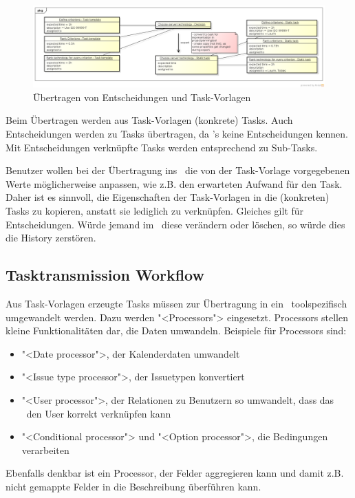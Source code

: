				\begin{figure}[H]
					\includegraphics[width=\textwidth]{architecture/media/img/decisionTaskRelation.png}
					\centering
					\caption{Übertragen von Entscheidungen und Task-Vorlagen}
					\label{fig:DecisionTaskRelation}
				\end{figure}
				
				Beim Übertragen werden aus Task-Vorlagen (konkrete) Tasks.
				Auch Entscheidungen werden zu Tasks übertragen, da \ppt's keine Entscheidungen kennen.
				Mit Entscheidungen verknüpfte Tasks werden entsprechend zu Sub-Tasks.
				
				Benutzer wollen bei der Übertragung ins \ppt\ die von der Task-Vorlage vorgegebenen Werte möglicherweise anpassen, wie z.B. den erwarteten Aufwand für den Task.
				Daher ist es sinnvoll, die Eigenschaften der Task-Vorlagen in die (konkreten) Tasks zu kopieren, anstatt sie lediglich zu verknüpfen.
				Gleiches gilt für Entscheidungen. Würde jemand im \dks\ diese verändern oder löschen,
				so würde dies die History zerstören.
			
		
		\subsection{Tasktransmission Workflow}
			Aus Task-Vorlagen erzeugte Tasks müssen zur Übertragung in ein \ppt\
			toolspezifisch umgewandelt werden. Dazu werden "<Processors"> eingesetzt.
			Processors stellen kleine Funktionalitäten dar, die Daten umwandeln.
			Beispiele für Processors sind:
			\begin{itemize}
				\item "<Date processor">, der Kalenderdaten umwandelt
				\item "<Issue type processor">, der Issuetypen konvertiert
				\item "<User processor">, der Relationen zu Benutzern so umwandelt, dass das \ppt\ den User korrekt verknüpfen kann
				\item "<Conditional processor"> und "<Option processor">, die Bedingungen verarbeiten
			\end{itemize}
			Ebenfalls denkbar ist ein Processor, der Felder aggregieren kann und damit z.B. nicht gemappte Felder in die Beschreibung überführen kann.
			
